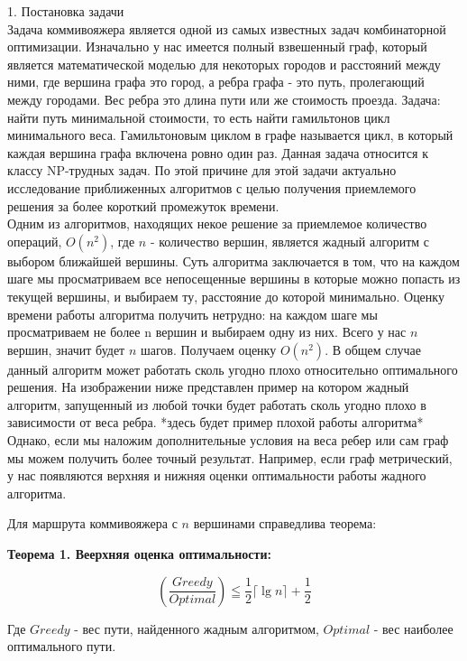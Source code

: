 \documentclass[a4paper, 14pt]{extarticle}
\begin{document}
1. Постановка задачи \\


Задача коммивояжера является одной из самых известных задач комбинаторной оптимизации. Изначально у нас имеется полный взвешенный граф, который является математической моделью для некоторых городов и расстояний между ними, где вершина графа это город, а ребра графа - это путь, пролегающий между городами. Вес ребра это длина пути или же стоимость проезда. Задача: найти путь минимальной стоимости, то есть найти гамильтонов цикл минимального веса. Гамильтоновым циклом в графе называется цикл, в который каждая вершина графа включена ровно один раз. Данная задача относится к классу NP-трудных задач. По этой причине для этой задачи актуально исследование приближенных алгоритмов с целью получения приемлемого решения за более короткий промежуток времени. \\
Одним из алгоритмов, находящих некое решение за приемлемое количество операций, $O(n^{2})$, где $n$ - количество вершин, является жадный алгоритм с выбором ближайшей вершины. Суть алгоритма заключается в том, что на каждом шаге мы просматриваем все непосещенные вершины в которые можно попасть из текущей вершины, и выбираем ту, расстояние до которой минимально. Оценку времени работы алгоритма получить нетрудно: на каждом шаге мы просматриваем не более n вершин и выбираем одну из них. Всего у нас $n$ вершин, значит будет $n$ шагов. Получаем оценку $O(n^{2})$. В общем случае данный алгоритм может работать сколь угодно плохо относительно оптимального решения. На изображении ниже представлен пример на котором жадный алгоритм, запущенный из любой точки будет работать сколь угодно плохо в зависимости от веса ребра.
*здесь будет пример плохой работы алгоритма*
Однако, если мы наложим дополнительные условия на веса ребер или сам граф мы можем получить более точный результат. Например, если граф метрический, у нас появляются верхняя и нижняя оценки оптимальности работы жадного алгоритма. \newline

Для маршрута коммивояжера с $n$ вершинами справедлива теорема:

\textbf{Теорема 1. Веерхняя оценка оптимальности:}

\begin{equation}
	(\frac{Greedy}{Optimal}) \leqq \frac{1}{2}\lceil{\lg n}\rceil + \frac{1}{2}
\end{equation}

Где $Greedy$ - вес пути, найденного жадным алгоритмом, $Optimal$ - вес наиболее оптимального пути.
\end{document}
